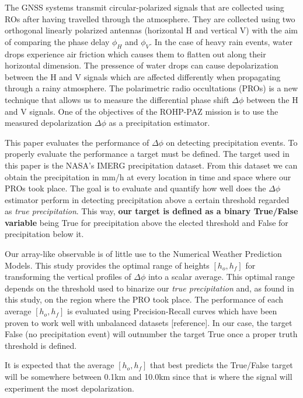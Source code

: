 \documentclass[twocolumn]{revtex4}
\begin{document}
The GNSS systems transmit circular-polarized signals that are collected 
using ROs after having travelled through the atmosphere. 
They are collected using two orthogonal linearly polarized antennas 
(horizontal H and vertical V) with the aim of comparing the phase
delay $\phi_H$ and $\phi_V$. In the case of heavy rain events,
water drops experience
air friction which causes them to flatten out along their horizontal 
dimension. The pressence of water drops can cause depolarization
between the H and V signals which are affected differently when 
propagating through a rainy atmosphere. The polarimetric radio occultations (PROs) is a 
new technique that allows us to measure the differential phase shift $\Delta \phi$
between the H and V signals. One of the objectives of 
the ROHP-PAZ mission is to use the measured depolarization $\Delta \phi$ 
as a precipitation estimator.

This paper evaluates the performance of $\Delta \phi$  on 
detecting precipitation events. To properly evaluate the performance 
a target must be defined. The target used in this paper
is the NASA's IMERG precipitation dataset. From this dataset we can obtain 
the precipitation in mm/h at every location in time and space where our 
PROs took place. The goal is to evaluate and quantify how well does 
the $\Delta \phi$ estimator perform in detecting precipitation above a certain
threshold regarded as {\it true precipitation}. This way, {\bf our target 
is defined as a binary True/False variable} being True for precipitation
above the elected threshold and False for precipitation below it. 

Our array-like observable is of little use to the Numerical Weather
Prediction Models. This study provides the optimal range of heights 
$[h_o, h_f]$ for transforming the vertical profiles of $\Delta\phi$ into a scalar 
average. This optimal range depends on the threshold used to binarize 
our {\it true precipitation} and, as found in this study, on the region where
the PRO took place. The performance of each average $[h_o, h_f]$ is evaluated
using Precision-Recall curves which have been proven to 
work well with unbalanced datasets [reference]. In our case, the target
False (no precipitation event) will outnumber the target True once a proper
truth threshold is defined. 

It is expected that the average $[h_o, h_f]$ that best predicts the 
True/False target will be somewhere between 0.1km and 10.0km since that 
is where the signal will experiment the most depolarization. 
\end{document}
